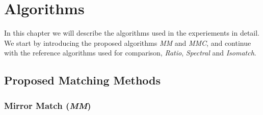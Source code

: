 \chapter{Algorithms}
\label{C:Algorithms}

In this chapter we will describe the algorithms used in the experiements
in detail. We start by introducing the proposed algorithms \emph{MM} and 
\emph{MMC}, and continue with the reference algorithms used for 
comparison, \emph{Ratio}, \emph{Spectral} and \emph{Isomatch}.

\section{Proposed Matching Methods}
\label{S:MatchingMethods}

\subsection{Mirror Match (\emph{MM})}

